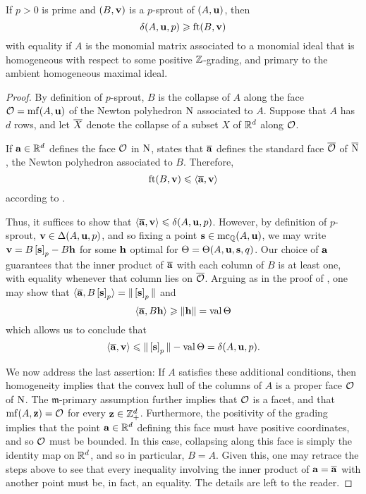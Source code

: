 \documentclass[11pt]{amsart}
\begin{document}
\begin{lemma}  If  $p>0$ is prime and $(B, \mathbf{v})$ is a $p$-sprout of  $(A, \mathbf{u})$, then \[ \delta(A, \mathbf{u}, p) \geqslant \operatorname{ft}(B, \mathbf{v})\]
with equality if $A$ is the monomial matrix associated to a monomial ideal that is homogeneous with respect to some positive $\mathbb{Z}$-grading, and primary to the ambient homogeneous maximal ideal.
\end{lemma}

\begin{proof}
By definition of $p$-sprout,  $B$ is the collapse of $A$ along the face $\mathcal{O} = \operatorname{mf}(A, \mathbf{u})$ of the Newton polyhedron $\mathrm{N}$ associated to $A$.  Suppose that $A$ has $d$ rows, and let $\overline{X}$ denote the collapse of a subset $X$ of $\mathbb{R}^d$ along $\mathcal{O}$.  

If $\mathbf{a} \in \mathbb{R}^d$ defines the face $\mathcal{O}$ in $\mathrm{N}$,   states that $\overline{\mathbf{a}}$ defines the standard face $\overline{\mathcal{O}}$ of $\overline{\mathrm{N}}$, the Newton polyhedron associated to $B$.  Therefore,
\[ \operatorname{ft}(B, \mathbf{v}) \leqslant \langle \overline{\mathbf{a}}, \mathbf{v} \rangle \] according to .

Thus, it suffices to show that $\langle \overline{\mathbf{a}}, \mathbf{v} \rangle \leqslant \delta(A, \mathbf{u}, p)$.  However, by definition of $p$-sprout, $\mathbf{v} \in \Delta(A, \mathbf{u}, p)$, and so fixing a point $\mathbf{s} \in \operatorname{mc}_{\mathbb{Q}}(A, \mathbf{u})$, we may write $ \mathbf{v} = B \left[ \mathbf{s} \right]_p - B \mathbf{h}$ for some $\mathbf{h}$  optimal for $\Theta = \Theta(A, \mathbf{u}, \mathbf{s}, q)$.  Our choice of $\mathbf{a}$ guarantees that the inner product of $\overline{\mathbf{a}}$ with each column of $B$ is at least one, with equality whenever that column lies on $\overline{\mathcal{O}}$.  Arguing as in the proof of , one may show that $\langle \overline{\mathbf{a}}, B \left[ \mathbf{s} \right]_p \rangle = \| \left[ \mathbf{s} \right]_p \|$ and \[ \langle \overline{\mathbf{a}},  B \mathbf{h} \rangle \geqslant \| \mathbf{h} \| = \operatorname{val} \Theta \] 
which allows us to conclude that \[ \langle \overline{\mathbf{a}}, \mathbf{v} \rangle \leqslant \| \left[ \mathbf{s} \right]_p \| - \operatorname{val} \Theta= \delta(A, \mathbf{u}, p).\]

We now address the last assertion:  If $A$ satisfies these additional conditions, then homogeneity implies that the convex hull of the columns of $A$ is a proper face $\mathcal{O}$ of $\mathrm{N}$.  The $\mathfrak{m}$-primary assumption further implies that $\mathcal{O}$ is a facet, and that $\operatorname{mf}(A, \mathbf{z}) = \mathcal{O}$ for every $\mathbf{z} \in \mathbb{Z}_+^d$.  Furthermore, the positivity of the grading implies that the point $\mathbf{a} \in \mathbb{R}^d$ defining this face must have positive coordinates, and so $\mathcal{O}$ must be bounded.  In this case, collapsing along this face is simply the identity map on $\mathbb{R}^d$, and so in particular, $B=A$.  Given this, one may retrace the steps above to see that every inequality involving the inner product of $\mathbf{a} = \overline{\mathbf{a}}$ with another point must be, in fact, an equality.  The details are left to the reader.
\end{proof}
\end{document}
